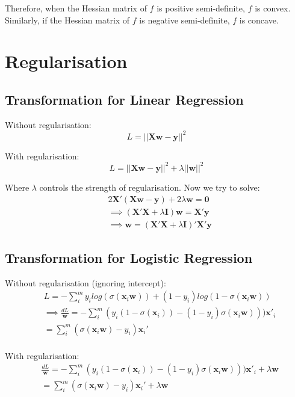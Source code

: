 \documentclass{article}
\newcommand{\V}[1]{\boldsymbol{#1}}
\begin{document}
Therefore, when the Hessian matrix of \(f\) is positive semi-definite, \(f\) is
convex. Similarly, if the Hessian matrix of \(f\) is negative semi-definite,
\(f\) is concave.

\section{Regularisation}
\subsection{Transformation for Linear Regression}
Without regularisation:
\begin{equation}
L=||\mathbf{X}\V{w}-\V{y}||^2
\end{equation}

With regularisation:
\begin{equation}
L=||\mathbf{X}\V{w}-\V{y}||^2+\lambda||\V{w}||^2
\end{equation}

Where \(\lambda\) controls the strength of regularisation. Now we try to solve:
\begin{equation}
\begin{split}
&2\mathbf{X}'(\mathbf{X}\V{w}-\V{y})+2\lambda \V{w}=\V{0}\\
&\implies (\mathbf{X}'\mathbf{X}+\lambda \mathbf{I})\V{w}=\mathbf{X}'\V{y}\\
&\implies \V{w}=(\mathbf{X}'\mathbf{X}+\lambda \mathbf{I})'\mathbf{X}'\V{y}
\end{split}
\end{equation}

\subsection{Transformation for Logistic Regression}

Without regularisation (ignoring intercept):
\begin{equation}
\begin{split}
&L=-\sum_{i}^my_ilog(\sigma(\V{x}_i\V{w}))+(1-y_i)log(1-\sigma(\V{x}_i\V{w}))\\
&\implies
\frac{dL}{\V{w}}=-\sum_{i}^m(y_i(1-\sigma(\V{x}_i))-(1-y_i)\sigma(\V{x}_i\V{w})))\V{x}'_i\\
&=\sum_{i}^m(\sigma(\V{x}_i\V{w})-y_i)\V{x}_i'\\
\end{split}
\end{equation}

With regularisation:
\begin{equation}
\begin{split}
&\frac{dL}{\V{w}}=-\sum_{i}^m(y_i(1-\sigma(\V{x}_i))-(1-y_i)\sigma(\V{x}_i\V{w})))\V{x}'_i+\lambda\V{w}\\
&=\sum_{i}^m(\sigma(\V{x}_i\V{w})-y_i)\V{x}_i'+\lambda\V{w}\\
\end{split}
\end{equation}
\end{document}
